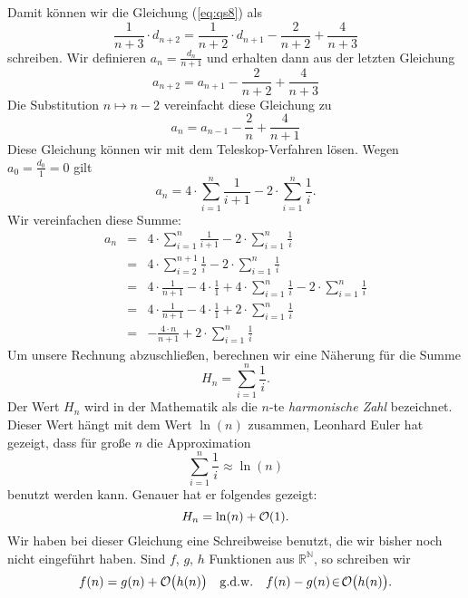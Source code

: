 Damit k\"onnen wir die Gleichung (\ref{eq:qs8}) als 
\begin{equation}
  \label{eq:qs9}
 \frac{1}{n+3} \cdot d_{n+2} = \frac{1}{n+2}\cdot d_{n+1} - \frac{2}{n+2} + \frac{4}{n+3}  
\end{equation}
schreiben.  Wir definieren $\displaystyle a_n = \frac{d_n}{n+1}$ und erhalten dann aus der
letzten Gleichung 
\[ a_{n+2} = a_{n+1} - \frac{2}{n+2} + \frac{4}{n+3} \]
Die Substitution $n \mapsto n-2$ vereinfacht diese Gleichung zu 
\begin{equation}
  \label{eq:qs10}
 a_{n} = a_{n-1} - \frac{2}{n} + \frac{4}{n+1}  
\end{equation}
Diese Gleichung k\"onnen wir mit dem Teleskop-Verfahren l\"osen.  Wegen $a_0 = \frac{d_0}{1} = 0$ gilt 
\begin{equation}
  \label{eq:qs11}
 a_{n} = 4 \cdot \sum_{i=1}^n \frac{1}{i+1} - 2 \cdot \sum_{i=1}^n \frac{1}{i}.  
\end{equation}
Wir vereinfachen diese Summe:
\[
\begin{array}{lcl}
 a_{n} & = & \displaystyle 4 \cdot \sum_{i=1}^n \frac{1}{i+1} - 2 \cdot \sum_{i=1}^n \frac{1}{i} \\[0.5cm]
       & = & \displaystyle 4 \cdot \sum_{i=2}^{n+1} \frac{1}{i} - 2 \cdot \sum_{i=1}^n \frac{1}{i} \\[0.5cm]
       & = & \displaystyle 4 \cdot \frac{1}{n+1} - 4 \cdot \frac{1}{1} + 4 \cdot \sum_{i=1}^{n} \frac{1}{i} - 2 \cdot \sum_{i=1}^n \frac{1}{i} \\[0.5cm]
       & = & \displaystyle 4 \cdot \frac{1}{n+1} - 4 \cdot \frac{1}{1} + 2 \cdot \sum_{i=1}^{n} \frac{1}{i}  \\[0.5cm]
       & = & \displaystyle - \frac{4 \cdot n}{n+1}  + 2 \cdot \sum_{i=1}^{n} \frac{1}{i}  
\end{array}
\]
Um unsere Rechnung abzuschlie{\ss}en, berechnen wir eine N\"aherung f\"ur die Summe 
\[ H_n = \sum\limits_{i=1}^{n}\frac{1}{i}.\]
Der Wert $H_n$ wird in der Mathematik als die $n$-te \emph{harmonische Zahl} bezeichnet.
Dieser Wert h\"angt mit dem Wert $\ln(n)$ zusammen, Leonhard Euler hat gezeigt, dass f\"ur
gro{\ss}e $n$ die Approximation
\[ \sum\limits_{i=1}^n \frac{1}{i} \approx \ln(n)  \]
benutzt werden kann.  Genauer hat er folgendes gezeigt:
\[ H_n = \ln(n) + \mathcal{O}(1). \]
Wir haben bei dieser Gleichung eine Schreibweise benutzt, die wir bisher noch nicht
eingef\"uhrt haben.  Sind $f$, $g$, $h$ Funktionen aus $\mathbb{R}^\mathbb{N}$, so schreiben
wir 
\[ f(n) = g(n) + \mathcal{O}\bigl(h(n)\bigr) \quad \mathrm{g.d.w.} \quad
   f(n) - g(n) \!\in\! \mathcal{O}\bigl(h(n)\bigr). 
\]

